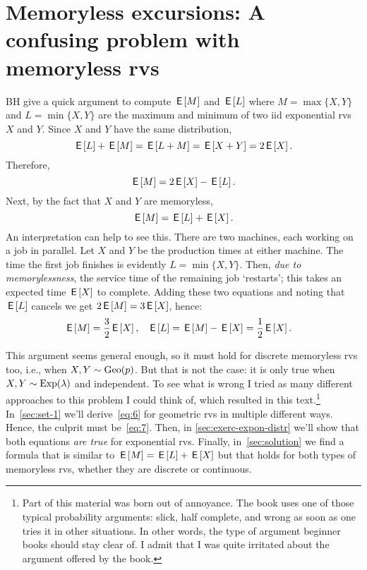 


\section{Memoryless excursions: A confusing problem with memoryless rvs}
\label{sec:memoryl-exerc-conf}
BH give a quick argument to compute $\,\mathsf{E}\left[M\right]$ and $\,\mathsf{E}\left[L\right]$ where
$M=\max\{X,Y\}$  and $L=\min\{X,Y\}$ are the maximum and minimum of two iid exponential rvs $X$ and $Y$.
Since  $X$ and $Y$  have the same distribution,
\begin{equation*}
\,\mathsf{E}\left[L\right] + \,\mathsf{E}\left[M\right] = \,\mathsf{E}\left[L+M\right]=\,\mathsf{E}\left[X+Y\right] = 2\,\mathsf{E}\left[X\right].
\end{equation*}
Therefore,
\begin{equation}
  \label{eq:6}
\,\mathsf{E}\left[M\right] = 2\,\mathsf{E}\left[X\right] - \,\mathsf{E}\left[L\right].
\end{equation}
Next, by the fact that  $X$ and $Y$ are memoryless,
\begin{equation}
  \label{eq:7}
\,\mathsf{E}\left[M\right] = \,\mathsf{E}\left[L\right]  + \,\mathsf{E}\left[X\right].
\end{equation}
An interpretation can help to see this. There are two machines, each working on a job in parallel.
Let $X$ and $Y$ be the production times at either machine.
The time the first job finishes is evidently $L=\min\{X, Y\}$.
Then, \emph{due to memorylessness}, the service time of the remaining job `restarts'; this takes an expected time $\,\mathsf{E}\left[X\right]$ to complete.
Adding these two equations and noting that $\,\mathsf{E}\left[L\right]$ cancels we get $2\,\mathsf{E}\left[M\right] = 3 \,\mathsf{E}\left[X\right] $, hence:
\begin{align}
\,\mathsf{E}\left[M\right] &= \frac 3 2 \,\mathsf{E}\left[X\right], & \,\mathsf{E}\left[L\right] &= \,\mathsf{E}\left[M\right] - \,\mathsf{E}\left[X\right] = \frac 1 2 \,\mathsf{E}\left[X\right]. \label{eq:35}
\end{align}

This argument seems general enough, so it must hold for discrete memoryless rvs too, i.e., when $X, Y \sim \mathrm{Geo}(p)$. But that is not the case: it is only true when $X, Y \sim \mathrm{Exp}(\lambda)$ and independent. To see what is wrong I tried as many different approaches to this problem I could think of, which  resulted in this text.\footnote{Part of this material was born out of annoyance.  The  book uses one of those typical probability arguments:  slick, half complete, and wrong as soon as one tries it in other situations. In other words, the type of argument beginner books should stay clear of. I admit that I was quite irritated about the argument offered by the book.} In~\cref{sec:set-1} we'll derive~\cref{eq:6}  for geometric rvs in multiple  different ways.
Hence, the culprit must be~\cref{eq:7}. Then, in \cref{sec:exerc-expon-distr} we'll show that both equations \emph{are true} for exponential rvs.
Finally, in~\cref{sec:solution} we find a formula that is similar to $\,\mathsf{E}\left[M\right] = \,\mathsf{E}\left[L\right] + \,\mathsf{E}\left[X\right]$ but that holds for both types of memoryless rvs, whether they are discrete or continuous.

